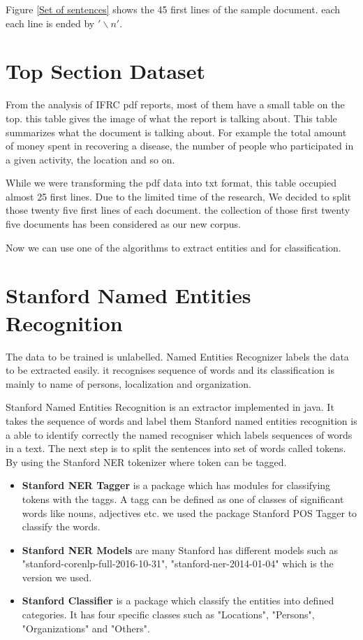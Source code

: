 Figure \ref{Set of sentences} shows the 45 first lines of the sample document. each each line is ended by  $'\backslash n'$.

\section{Top Section Dataset \label{top}}

From the analysis of IFRC pdf reports, most of them have a small table on the top. this table gives the image of what the report is talking about. This table summarizes what the document is talking about. For example the total amount of money spent in recovering a disease, the number of people who participated in a given activity, the location and so on.

While we were transforming the pdf data into txt format, this table occupied almost 25 first lines. Due to the limited time of the research, We decided to split those twenty five first lines of each document. the collection of those first twenty five documents has been considered as our new corpus.

Now  we can use  one of the algorithms to extract entities and for classification.
\section{Stanford Named Entities Recognition}

The data to be trained is unlabelled. Named Entities Recognizer labels the data to be extracted easily. it recognises sequence of words and its classification is mainly to name of persons, localization and organization.

Stanford Named Entities Recognition is an extractor implemented in java. It takes the sequence of words and label them 
Stanford named entities recognition is  a able to identify correctly the named recogniser which labels sequences of words in a text. The next step is to split the sentences into set of words called tokens. By using the Stanford NER tokenizer  where token can be tagged. 

\begin{itemize} 
\item \textbf{Stanford NER Tagger} is a package which has modules for classifying tokens with the taggs. A tagg can be defined as one of classes of significant words like nouns, adjectives etc. we used the package Stanford POS Tagger to classify the words. 
\item \textbf{Stanford NER Models} are many Stanford has different models such as "stanford-corenlp-full-2016-10-31", "stanford-ner-2014-01-04" which is the version we used. 

\item \textbf{Stanford Classifier} is a package which classify the entities into defined categories. It has four specific classes such as  "Locations",  "Persons",  "Organizations" and    "Others".
\end{itemize}

